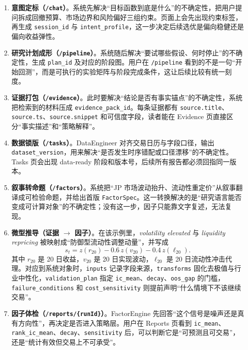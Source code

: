 \documentclass{article}
\newcommand{\tok}[1]{\nolinkurl{#1}}
\newenvironment{tokenblock}{\begingroup\RaggedRight\setlength{\parfillskip}{0pt plus 1fil}}{\par\endgroup}
\begin{document}
\begin{tokenblock}
\begin{enumerate}
  \item \textbf{意图定标（\tok{/chat}）}。系统先解决“目标函数到底是什么”的不确定性，把用户提问拆成回撤预算、市场边界和风险偏好三组约束。页面上会先出现约束标签，再生成 \tok{session_id} 与 \tok{intent_profile}，这一步决定后续选优是偏向稳健还是偏向收益弹性。

  \item \textbf{研究计划成形（\tok{/pipeline}）}。系统随后解决“要试哪些假设、何时停止”的不确定性，生成 \tok{plan_id} 及对应的阶段图。用户在 \tok{/pipeline} 看到的不是一句“开始回测”，而是可执行的实验矩阵与阶段完成条件，这让后续比较有统一刻度。

  \item \textbf{证据打包（\tok{/evidence}）}。此时要解决“结论是否有事实锚点”的不确定性，系统把检索到的材料压成 \tok{evidence_pack_id}。每条证据都有 \tok{source.title}、\tok{source.ts}、\tok{source.snippet} 和可信度字段，读者能在 Evidence 页直接区分“事实描述”和“策略解释”。

  \item \textbf{数据锁版（\tok{/tasks}）}。DataEngineer 对齐交易日历与字段口径，输出 \tok{dataset_version}，用来解决“是否发生时序错配或口径漂移”的不确定性。Tasks 页会出现 data-ready 阶段和版本号，后续所有报告都必须回指同一版本。

  \item \textbf{叙事转命题（\tok{/factors}）}。系统把“JP 市场波动抬升、流动性重定价”从叙事翻译成可检验命题，并给出首版 \tok{FactorSpec}。这一转换解决的是“研究语言能否变成可计算对象”的不确定性；没有这一步，因子只能靠文字复述，无法复现。

  \item \textbf{微型推导（证据 $\rightarrow$ 因子）}。在该示例里，\textit{volatility elevated} 与 \textit{liquidity repricing} 被映射成“防御型流动性调整动量”，并写成
  \[
  s_t=z(r_{20})-0.6\,z(v_{20})-0.4\,z(\ell_{20}) .
  \]
  其中 \(r_{20}\) 是 20 日收益，\(v_{20}\) 是 20 日实现波动，\(\ell_{20}\) 是 20 日流动性冲击代理。对应到系统对象时，\tok{inputs} 记录字段来源，\tok{transforms} 固化去极值与行业中性化，\tok{validation_plan} 指定 \tok{ic_mean}、\tok{decay}、\tok{oos_gap} 的门槛，\tok{failure_conditions} 和 \tok{cost_sensitivity} 则提前声明“什么情境下不该继续交易”。

  \item \textbf{因子体检（\tok{/reports/{runId}}）}。FactorEngine 先回答“这个信号是噪声还是真有方向性”，再决定是否进入策略层。用户在 Reports 页看到 \tok{ic_mean}、\tok{rank_ic_mean}、\tok{decay}、\tok{sensitivity} 后，可以判断它是“可预测且可交易”，还是“统计有效但交易上不可承受”。


\end{enumerate}
\end{tokenblock}
\end{document}
